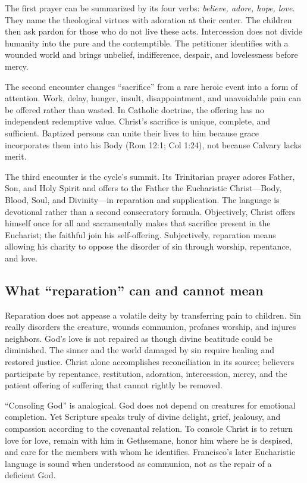 The first prayer can be summarized by its four verbs: \emph{believe, adore, hope, love}. They name the theological virtues with adoration at their center. The children then ask pardon for those who do not live these acts. Intercession does not divide humanity into the pure and the contemptible. The petitioner identifies with a wounded world and brings unbelief, indifference, despair, and lovelessness before mercy.

The second encounter changes “sacrifice” from a rare heroic event into a form of attention. Work, delay, hunger, insult, disappointment, and unavoidable pain can be offered rather than wasted. In Catholic doctrine, the offering has no independent redemptive value. Christ's sacrifice is unique, complete, and sufficient. Baptized persons can unite their lives to him because grace incorporates them into his Body (Rom 12:1; Col 1:24), not because Calvary lacks merit.

The third encounter is the cycle's summit. Its Trinitarian prayer adores Father, Son, and Holy Spirit and offers to the Father the Eucharistic Christ---Body, Blood, Soul, and Divinity---in reparation and supplication. The language is devotional rather than a second consecratory formula. Objectively, Christ offers himself once for all and sacramentally makes that sacrifice present in the Eucharist; the faithful join his self-offering. Subjectively, reparation means allowing his charity to oppose the disorder of sin through worship, repentance, and love.

\subsection{What “reparation” can and cannot mean}

Reparation does not appease a volatile deity by transferring pain to children. Sin really disorders the creature, wounds communion, profanes worship, and injures neighbors. God's love is not repaired as though divine beatitude could be diminished. The sinner and the world damaged by sin require healing and restored justice. Christ alone accomplishes reconciliation in its source; believers participate by repentance, restitution, adoration, intercession, mercy, and the patient offering of suffering that cannot rightly be removed.

“Consoling God” is analogical. God does not depend on creatures for emotional completion. Yet Scripture speaks truly of divine delight, grief, jealousy, and compassion according to the covenantal relation. To console Christ is to return love for love, remain with him in Gethsemane, honor him where he is despised, and care for the members with whom he identifies. Francisco's later Eucharistic language is sound when understood as communion, not as the repair of a deficient God.

